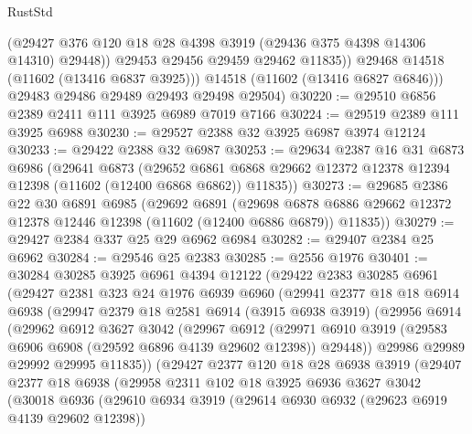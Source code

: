 \begin{lexlean}{RustStd}
\begin{coremodule}
                (@29427 @376 @120 @18 @28 @4398 @3919 (@29436 @375 @4398 @14306 @14310) @29448))
              @29453
              @29456
              @29459
              @29462
              @11835))
          @29468
          @14518
          (@11602 (@13416 @6837 @3925)))
        @14518
        (@11602 (@13416 @6827 @6846)))
      @29483
      @29486
      @29489
      @29493
      @29498
      @29504)
@30220 := @29510 @6856 @2389 @2411 @111 @3925 @6989 @7019 @7166
@30224 := @29519 @2389 @111 @3925 @6988
@30230 := @29527 @2388 @32 @3925 @6987 @3974 @12124
@30233 := @29422 @2388 @32 @6987
@30253 := @29634
    @2387
    @16
    @31
    @6873
    @6986
    (@29641
      @6873
      (@29652 @6861 @6868 @29662 @12372 @12378 @12394 @12398 (@11602 (@12400 @6868 @6862)) @11835))
@30273 := @29685
    @2386
    @22
    @30
    @6891
    @6985
    (@29692
      @6891
      (@29698 @6878 @6886 @29662 @12372 @12378 @12446 @12398 (@11602 (@12400 @6886 @6879)) @11835))
@30279 := @29427 @2384 @337 @25 @29 @6962 @6984
@30282 := @29407 @2384 @25 @6962
@30284 := @29546 @25 @2383
@30285 := @2556 @1976
@30401 := @30284
    @30285
    @3925
    @6961
    @4394
    @12122
    (@29422
      @2383
      @30285
      @6961
      (@29427
        @2381
        @323
        @24
        @1976
        @6939
        @6960
        (@29941
          @2377
          @18
          @18
          @6914
          @6938
          (@29947
            @2379
            @18
            @2581
            @6914
            (@3915 @6938 @3919)
            (@29956
              @6914
              (@29962
                @6912
                @3627
                @3042
                (@29967
                  @6912
                  (@29971
                    @6910
                    @3919
                    (@29583 @6906 @6908 (@29592 @6896 @4139 @29602 @12398))
                    @29448))
                @29986
                @29989
                @29992
                @29995
                @11835))
            (@29427
              @2377
              @120
              @18
              @28
              @6938
              @3919
              (@29407
                @2377
                @18
                @6938
                (@29958
                  @2311
                  @102
                  @18
                  @3925
                  @6936
                  @3627
                  @3042
                  (@30018
                    @6936
                    (@29610
                      @6934
                      @3919
                      (@29614 @6930 @6932 (@29623 @6919 @4139 @29602 @12398))

\end{coremodule}
\end{lexlean}
